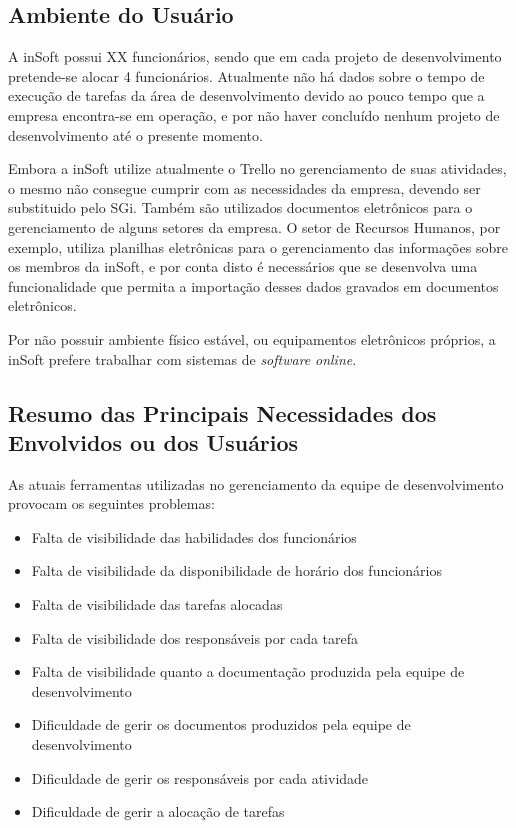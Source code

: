     \subsection{Ambiente do Usuário}

      A inSoft possui XX funcionários, sendo que em cada projeto de desenvolvimento pretende-se alocar 4 funcionários. Atualmente não há dados sobre o tempo de execução de tarefas da área de desenvolvimento devido ao pouco tempo que a empresa encontra-se em operação, e por não haver concluído nenhum projeto de desenvolvimento até o presente momento.

      Embora a inSoft utilize atualmente o Trello no gerenciamento de suas atividades, o mesmo não consegue cumprir com as necessidades da empresa, devendo ser substituido pelo SGi. Também são utilizados documentos eletrônicos para o gerenciamento de alguns setores da empresa. O setor de Recursos Humanos, por exemplo, utiliza planilhas eletrônicas para o gerenciamento das informações sobre os membros da inSoft, e por conta disto é necessários que se desenvolva uma funcionalidade que permita a importação desses dados gravados em documentos eletrônicos.

      Por não possuir ambiente físico estável, ou equipamentos eletrônicos próprios, a inSoft prefere trabalhar com sistemas de \emph{software} \emph{online}.

    \subsection{Resumo das Principais Necessidades dos Envolvidos ou dos Usuários}

      As atuais  ferramentas utilizadas no gerenciamento da equipe de desenvolvimento provocam os seguintes problemas:

      \begin{itemize}
        \item Falta de visibilidade das habilidades dos funcionários
        \item Falta de visibilidade da disponibilidade de horário dos funcionários
        \item Falta de visibilidade das tarefas alocadas
        \item Falta de visibilidade dos responsáveis por cada tarefa
        \item Falta de visibilidade quanto a documentação produzida pela equipe de desenvolvimento
        \item Dificuldade de gerir os documentos produzidos pela equipe de desenvolvimento
        \item Dificuldade de gerir os responsáveis por cada atividade
        \item Dificuldade de gerir a alocação de tarefas
      \end{itemize}

